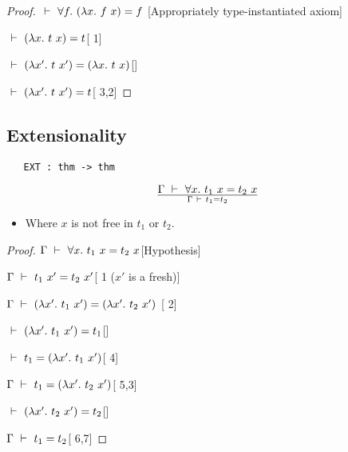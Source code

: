 \vspace{12pt plus2pt minus1pt}

\begin{proof}
\item $\ \vdash\ \forall f.\ (\lambda x.\ f\ x) = f$\hfill 
[Appropriately type-instantiated axiom]
\item  $\ \vdash\ (\lambda x.\ t\ x) = t$\hfill [ 1]
\item $\turn(\lquant{x'}t\ x')=(\lquant{x}t\ x)$\hfill []
\item $\ \vdash\ (\lambda x'.\ t\ x')=t$\hfill [ 3,2]
\end{proof}



\subsection{Extensionality}

\begin{boxed}
\begin{verbatim}
   EXT : thm -> thm
\end{verbatim}\end{boxed}

\vspace{12pt plus2pt minus1pt}

$$\Gamma\turn\uquant{x} t_1\ x = t_2\ x\over\Gamma\turn t_1=t_2$$
\begin{itemize}
\item Where $x$ is not free in $t_1$ or $t_2$.
\end{itemize}

\vspace{12pt plus2pt minus1pt}

\begin{proof}
\item $\Gamma\turn\uquant{x}t_1\ x=t_2\ x$\hfill [Hypothesis]
\item $\Gamma\ \vdash\  t_1\ x'=t_2\ x'$\hfill [ 1 ($x'$ is a fresh)]
\item $\Gamma\ \vdash\ (\lambda x'.\ t_1\ x') = (\lambda x'.\ t_2\ x')$\hfill
	[ 2]
\item $\ \vdash\ (\lambda x'.\ t_1\ x') = t_1$\hfill []
\item $\ \vdash\  t_1 = (\lambda x'.\ t_1\ x')$\hfill [ 4]
\item $\Gamma\turn t_1 = (\lquant{x'}t_2\ x')$\hfill [ 5,3]
\item $\ \vdash\ (\lambda x'.\ t_2\ x') = t_2$\hfill []
\item $\Gamma\ \vdash\  t_1=t_2$\hfill [ 6,7]
\end{proof}




